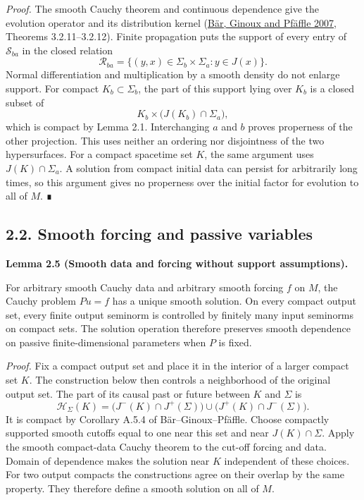 \documentclass[
  english,
  11pt,
  reqno]{amsart}
\makeatletter
\newcommand{\paperdisplaynext}{%
  \let\paper@savedstartsection\@startsection
  \def\@startsection##1##2##3##4##5##6{%
    \let\@startsection\paper@savedstartsection
    \@tempskipa ##5\relax
    \ifdim\@tempskipa<\z@
      \def\paper@afterskip{.35\baselineskip}%
    \else
      \def\paper@afterskip{##5}%
    \fi
    \@startsection{##1}{##2}{##3}{##4}{\paper@afterskip}{##6}}}
\newcommand{\paperdisplaysection}{\paperdisplaynext\subsection}
\newcommand{\pandocstatementheading}[1]{%
  \par\if@nobreak\else
    \addpenalty{\@beginparpenalty}%
    \addvspace{.5\baselineskip plus .2\baselineskip minus .2\baselineskip}%
  \fi
  {\normalfont\bfseries #1\par}%
  \nobreak\@afterindenttrue\@afterheading
}
\makeatother
\begin{document}
\emph{Proof.} The smooth Cauchy theorem and continuous dependence give
the evolution operator and its distribution kernel
(\hyperref[ref-BarGinouxPfaeffle2007]{Bär, Ginoux and Pfäffle 2007},
Theorems 3.2.11--3.2.12). Finite propagation puts the support of every
entry of \(\mathcal S_{ba}\) in the closed relation \[
\mathcal R_{ba}
=\{(y,x)\in\Sigma_b\times\Sigma_a:y\in J(x)\}.
\] Normal differentiation and multiplication by a smooth density do not
enlarge support. For compact \(K_b\subset\Sigma_b\), the part of this
support lying over \(K_b\) is a closed subset of \[
K_b\times\bigl(J(K_b)\cap\Sigma_a\bigr),
\] which is compact by Lemma 2.1. Interchanging \(a\) and \(b\) proves
properness of the other projection. This uses neither an ordering nor
disjointness of the two hypersurfaces. For a compact spacetime set
\(K\), the same argument uses \(J(K)\cap\Sigma_a\). A solution from
compact initial data can persist for arbitrarily long times, so this
argument gives no properness over the initial factor for evolution to
all of \(M\). ∎

\protect{}\label{sec:smooth-and-passive-regularity}
\paperdisplaysection{2.2. Smooth forcing and passive
variables}\label{smooth-forcing-and-passive-variables}
\pandocstatementheading{\protect{}\label{lem:smooth-noncompact-cauchy}Lemma 2.5 (Smooth data and forcing without support assumptions).}

For arbitrary smooth Cauchy data and arbitrary smooth forcing \(f\) on
\(M\), the Cauchy problem \(Pu=f\) has a unique smooth solution. On
every compact output set, every finite output seminorm is controlled by
finitely many input seminorms on compact sets. The solution operation
therefore preserves smooth dependence on passive finite-dimensional
parameters when \(P\) is fixed.

\emph{Proof.} Fix a compact output set and place it in the interior of a
larger compact set \(K\). The construction below then controls a
neighborhood of the original output set. The part of its causal past or
future between \(K\) and \(\Sigma\) is \[
\mathcal H_\Sigma(K)
=\bigl(J^-(K)\cap J^+(\Sigma)\bigr)
\cup\bigl(J^+(K)\cap J^-(\Sigma)\bigr).
\] It is compact by Corollary A.5.4 of Bär--Ginoux--Pfäffle. Choose
compactly supported smooth cutoffs equal to one near this set and near
\(J(K)\cap\Sigma\). Apply the smooth compact-data Cauchy theorem to the
cut-off forcing and data. Domain of dependence makes the solution near
\(K\) independent of these choices. For two output compacts the
constructions agree on their overlap by the same property. They
therefore define a smooth solution on all of \(M\).
\end{document}
